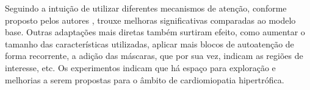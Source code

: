 Seguindo a intuição de utilizar diferentes mecanismos de atenção, conforme proposto pelos autores \cite{yangNeuralNetworkDesign2024a}, trouxe melhoras significativas comparadas ao modelo base. Outras adaptações mais diretas também surtiram efeito, como aumentar o tamanho das características utilizadas, aplicar mais blocos de autoatenção de forma recorrente, a adição das máscaras, que por sua vez, indicam as regiões de interesse, etc. Os experimentos indicam que há espaço para exploração e melhorias a serem propostas para o âmbito de cardiomiopatia hipertrófica.

